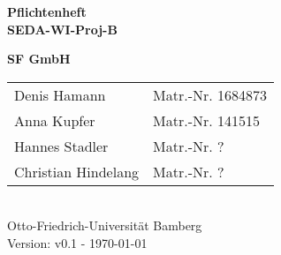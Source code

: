 \documentclass[pdftex, a4paper, 12pt]{article}
\begin{document}


\begin{titlepage}

{\sffamily
\vspace*{2cm}
\begin{center}
	\bfseries
	\LARGE {Pflichtenheft\\SEDA-WI-Proj-B}
\end{center}
\vspace{1cm}
\begin{center}

	{\Large\bfseries SF GmbH\\[5mm]}

	\begin{tabular}{ll}
		Denis Hamann & Matr.-Nr. 1684873 \\[3mm]

		Anna Kupfer & Matr.-Nr.  141515\\[3mm]

		Hannes Stadler & Matr.-Nr. ? \\[3mm]

		Christian Hindelang & Matr.-Nr. ? \\[3mm]


	\end{tabular}\\[0.5cm]
	
{\scriptsize Otto-Friedrich-Universität Bamberg} \\[21pt]


{\footnotesize Version: v0.1 - \today }



\end{center}
}
\end{titlepage}


\newpage

\textcolor{MidnightBlue}{\tableofcontents}

\textcolor{MidnightBlue}{\listoffigures}

\newpage

\newpage

\newpage

\newpage

\newpage

\newpage

\newpage

\newpage

\newpage

\newpage

\newpage

\newpage

\newpage 
%
\end{document}
